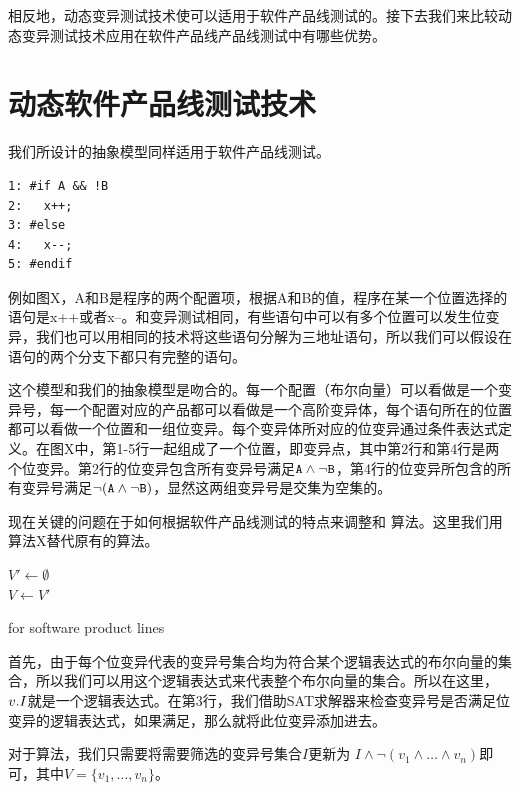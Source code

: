\documentclass[nofonts]{ctexrep}
\begin{document}
相反地，动态变异测试技术使可以适用于软件产品线测试的。接下去我们来比较动态变异测试技术应用在软件产品线产品线测试中有哪些优势。

\section{动态软件产品线测试技术}
我们所设计的抽象模型同样适用于软件产品线测试。

\begin{verbatim}
1: #if A && !B
2:   x++;
3: #else
4:   x--;
5: #endif
\end{verbatim}

例如图X，A和B是程序的两个配置项，根据A和B的值，程序在某一个位置选择的语句是x++或者x--。和变异测试相同，有些语句中可以有多个位置可以发生位变异，我们也可以用相同的技术将这些语句分解为三地址语句，所以我们可以假设在语句的两个分支下都只有完整的语句。

这个模型和我们的抽象模型是吻合的。每一个配置（布尔向量）可以看做是一个变异号，每一个配置对应的产品都可以看做是一个高阶变异体，每个语句所在的位置都可以看做一个位置和一组位变异。每个变异体所对应的位变异通过条件表达式定义。在图X中，第1-5行一起组成了一个位置，即变异点，其中第2行和第4行是两个位变异。第2行的位变异包含所有变异号满足$\tt A \wedge \neg B$，第4行的位变异所包含的所有变异号满足$\tt \neg (A \wedge \neg B)$，显然这两组变异号是交集为空集的。

现在关键的问题在于如何根据软件产品线测试的特点来调整\filterv 和 \filterm 算法。这里我们用算法X替代原有的\filterv 算法。

\begin{algorithm}
  $V' \leftarrow \emptyset$\\
  $V \leftarrow V'$  
\caption{\filterv for software product lines}
\label{alg:spl}
\end{algorithm}

首先，由于每个位变异代表的变异号集合均为符合某个逻辑表达式的布尔向量的集合，所以我们可以用这个逻辑表达式来代表整个布尔向量的集合。所以在这里，$v.I$就是一个逻辑表达式。在第3行，我们借助SAT求解器来检查变异号是否满足位变异的逻辑表达式，如果满足，那么就将此位变异添加进去。

对于\filterm 算法，我们只需要将需要筛选的变异号集合$I$更新为 $I \wedge \neg(v_1 \wedge \ldots \wedge v_n)$即可，其中$V = \{v_1,
\ldots, v_n\}$。
\end{document}
